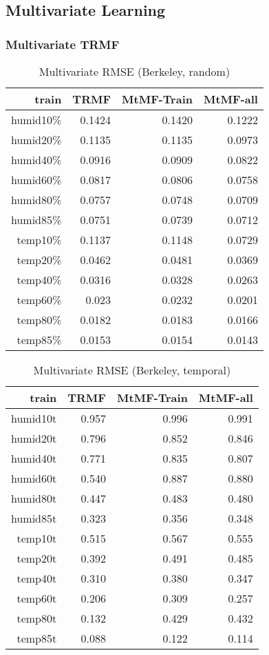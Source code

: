 
\subsection{Multivariate Learning}
\subsubsection{Multivariate TRMF}

\begin{table}[htbp]
\setlength{\tabcolsep}{2pt}
\centering
\caption{Multivariate RMSE (Berkeley, random)}
\label{table:multi_berkeley_random}
\begin{tabular}{r | r r r}
train	&TRMF	&MtMF-Train	&MtMF-all \\ \hline
humid10\%	&0.1424	&0.1420	&0.1222\\
humid20\%	&0.1135	&0.1135	&0.0973\\
humid40\%	&0.0916	&0.0909	&0.0822\\
humid60\%	&0.0817	&0.0806	&0.0758\\
humid80\%	&0.0757	&0.0748	&0.0709\\
humid85\%	&0.0751	&0.0739	&0.0712\\ \hline
 temp10\%	&0.1137	&0.1148	&0.0729\\
 temp20\%	&0.0462	&0.0481	&0.0369\\
 temp40\%	&0.0316	&0.0328	&0.0263\\
 temp60\%	&0.023	&0.0232	&0.0201\\
 temp80\%	&0.0182	&0.0183	&0.0166\\
 temp85\%	&0.0153	&0.0154	&0.0143\\
\end{tabular}
\end{table}


\begin{table}[htbp]
\setlength{\tabcolsep}{2pt}
\centering
\caption{Multivariate RMSE (Berkeley, temporal)}
\label{table:multi_berkeley_temporal}
\begin{tabular}{r | r r r}
train	&TRMF	&MtMF-Train	&MtMF-all \\ \hline
humid10t	&0.957&0.996& 	0.991\\
humid20t	&0.796&0.852& 	0.846\\
humid40t	&0.771&0.835& 	0.807\\
humid60t	&0.540&0.887& 	0.880\\
humid80t	&0.447&0.483& 	0.480\\
humid85t	&0.323&0.356& 	0.348\\	\hline
 temp10t	&0.515&0.567& 	0.555\\
 temp20t	&0.392&0.491& 	0.485\\
 temp40t	&0.310&0.380& 	0.347\\
 temp60t	&0.206&0.309& 	0.257\\
 temp80t	&0.132&0.429& 	0.432\\
 temp85t	&0.088&0.122& 	0.114\\
\end{tabular}
\end{table}

